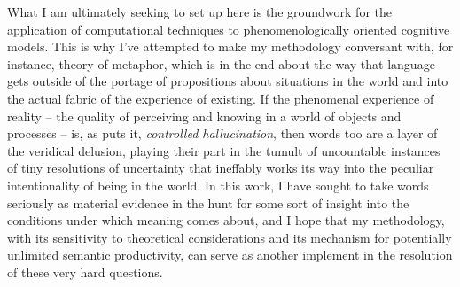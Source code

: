 What I am ultimately seeking to set up here is the groundwork for the application of computational techniques to phenomenologically oriented cognitive models.  This is why I've attempted to make my methodology conversant with, for instance,  theory of metaphor, which is in the end about the way that language gets outside of the portage of propositions about situations in the world and into the actual fabric of the experience of existing.  If the phenomenal experience of reality -- the quality of perceiving and knowing in a world of objects and processes -- is, as \cite{Clark2016} puts it, \emph{controlled hallucination}, then words too are a layer of the veridical delusion, playing their part in the tumult of uncountable instances of tiny resolutions of uncertainty that ineffably works its way into the peculiar intentionality of being in the world.  In this work, I have sought to take words seriously as material evidence in the hunt for some sort of insight into the conditions under which meaning comes about, and I hope that my methodology, with its sensitivity to theoretical considerations and its mechanism for potentially unlimited semantic productivity, can serve as another implement in the resolution of these very hard questions.

